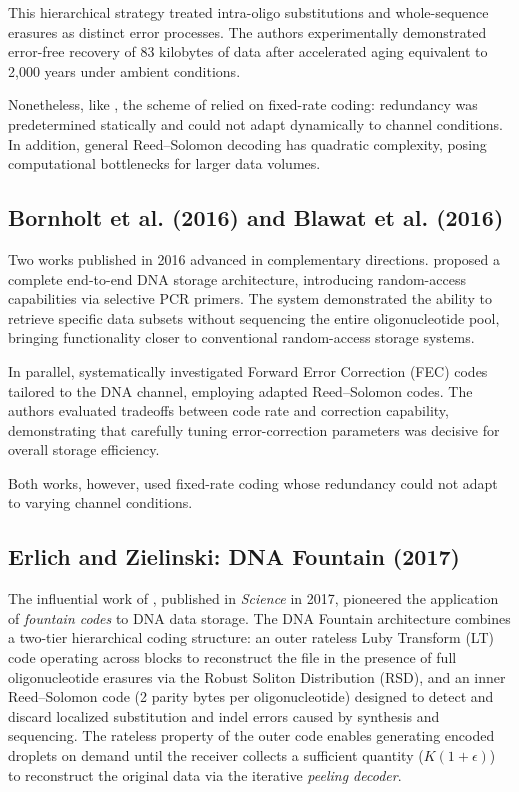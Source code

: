 This hierarchical strategy treated intra-oligo substitutions and whole-sequence erasures as distinct error processes. The authors experimentally demonstrated error-free recovery of 83 kilobytes of data after accelerated aging equivalent to 2,000 years under ambient conditions.

Nonetheless, like , the scheme of  relied on fixed-rate coding: redundancy was predetermined statically and could not adapt dynamically to channel conditions. In addition, general Reed--Solomon decoding has quadratic complexity, posing computational bottlenecks for larger data volumes.

\subsection{Bornholt et al. (2016) and Blawat et al. (2016)}

Two works published in 2016 advanced in complementary directions.  proposed a complete end-to-end DNA storage architecture, introducing random-access capabilities via selective PCR primers. The system demonstrated the ability to retrieve specific data subsets without sequencing the entire oligonucleotide pool, bringing functionality closer to conventional random-access storage systems.

In parallel,  systematically investigated Forward Error Correction (FEC) codes tailored to the DNA channel, employing adapted Reed--Solomon codes. The authors evaluated tradeoffs between code rate and correction capability, demonstrating that carefully tuning error-correction parameters was decisive for overall storage efficiency.

Both works, however, used fixed-rate coding whose redundancy could not adapt to varying channel conditions.

\subsection{Erlich and Zielinski: DNA Fountain (2017)}

The influential work of , published in \emph{Science} in 2017, pioneered the application of \emph{fountain codes} to DNA data storage. The DNA Fountain architecture combines a two-tier hierarchical coding structure: an outer rateless Luby Transform (LT) code operating across blocks to reconstruct the file in the presence of full oligonucleotide erasures via the Robust Soliton Distribution (RSD), and an inner Reed--Solomon code (2 parity bytes per oligonucleotide) designed to detect and discard localized substitution and indel errors caused by synthesis and sequencing. The rateless property of the outer code enables generating encoded droplets on demand until the receiver collects a sufficient quantity ($K(1 + \epsilon)$) to reconstruct the original data via the iterative \emph{peeling decoder}.

